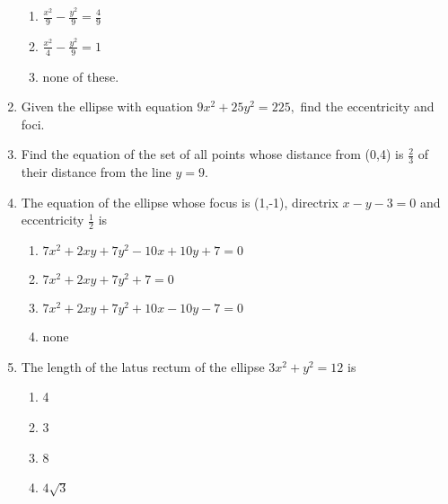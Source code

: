 \begin{enumerate}[label=\thesubsection.\arabic*,ref=\thesubsection.\theenumi,resume*]
\begin{enumerate}
	\item  $\frac{x^2}{9}-\frac{y^2}{9}=\frac{4}{9}$
	\item  $\frac{x^2}{4}-\frac{y^2}{9}=1$
\item  none of these.
\end{enumerate}
 \item Given the ellipse with equation $9x^2+25y^2=225,$ find the eccentricity and foci.
 \item Find the equation of the set of all points whose distance from (0,4) is $\frac{2}{3}$ of their distance from the line $y=9$.
\item The equation of the ellipse whose focus is (1,-1), directrix $x-y-3
	=0$ and eccentricity $\frac{1}{2}$ is
\begin{enumerate}
\item $7x^2+2xy+7y^2-10x+10y+7=0$
\item $7x^2+2xy+7y^2+7=0$
\item $7x^2+2xy+7y^2+10x-10y-7=0$ 
\item none
\end{enumerate}
\item The length of the latus rectum of the ellipse $3x^2+y^2=12$ is
\begin{enumerate}
\item 4
\item 3
\item 8
\item $4\sqrt{3}$
\end{enumerate}
\end{enumerate}
